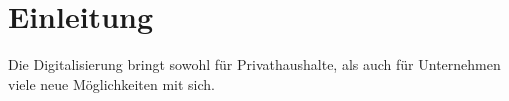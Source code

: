 \chapter{Einleitung}

Die Digitalisierung bringt sowohl für Privathaushalte, als auch für Unternehmen viele neue Möglichkeiten mit sich. 